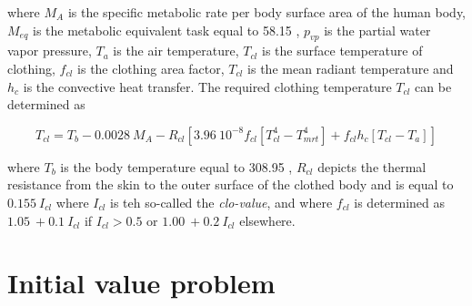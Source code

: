 where $M_{A}$ is the specific metabolic rate per body surface area of the human body, $M_{eq}$ is the metabolic equivalent task equal to 58.15 \watt\rpsquare\metre, $p_{vp}$ is the partial water vapor pressure, $T_{a}$ is the air temperature, $T_{cl}$ is the surface temperature of clothing, $f_{cl}$ is the clothing area factor, $T_{cl}$ is the mean radiant temperature and $h_{c}$ is the convective heat transfer. The required clothing temperature $T_{cl}$ can be determined as

\begin{dmath}
T_{cl} = T_{b} - 0.0028\ M_{A} - R_{cl} \left[ 3.96\ 10^{-8} f_{cl} \left[ T_{cl}^{4} - T_{mrt}^{4} \right] + f_{cl} h_{c} \left[ T_{cl} - T_{a} \right] \right]
\end{dmath}

where $T_{b}$ is the body temperature equal to 308.95 \kelvin, $R_{cl}$ depicts the thermal resistance from the skin to the outer surface of the clothed body and is equal to $0.155\ I_{cl}$ where $I_{cl}$ is teh so-called the \emph{clo-value}, and where $f_{cl}$ is determined as $1.05\ + 0.1\ I_{cl}$ if $I_{cl} > 0.5$ or $1.00\ + 0.2\ I_{cl}$ elsewhere.

\section{Initial value problem}

{}






